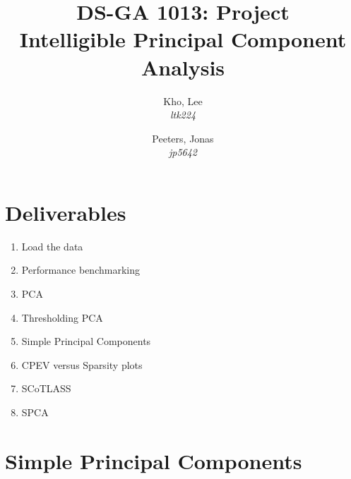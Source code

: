 \documentclass[10pt,letterpaper]{article}
\author{
	Kho, Lee\\
	\textit{ltk224}
	\and
	Peeters, Jonas\\
	\textit{jp5642}
}
\title{DS-GA 1013: Project\\Intelligible Principal Component Analysis}
\begin{document}
\maketitle
\section*{Deliverables}
\begin{enumerate}
\item Load the data
\item Performance benchmarking
\item PCA
\item Thresholding PCA
\item Simple Principal Components
\item CPEV versus Sparsity plots
\item SCoTLASS
\item SPCA
\end{enumerate}
\section*{Simple Principal Components}
\end{document}

